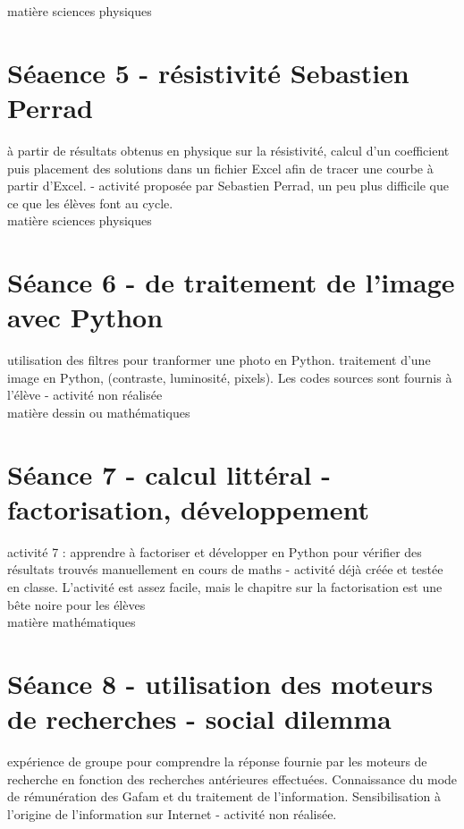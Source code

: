 \documentclass{moncours}
\begin{document}
matière sciences physiques

\section{Séaence 5 - résistivité Sebastien Perrad}

à partir de résultats obtenus en physique sur la résistivité, calcul d'un coefficient puis placement des solutions dans un fichier Excel afin de tracer une courbe à partir d'Excel. - activité proposée par Sebastien Perrad, un peu plus difficile que ce que les élèves font au cycle.\\

matière sciences physiques

\section{Séance 6 - de traitement de l'image avec Python}

utilisation des filtres pour tranformer une photo en Python. traitement d'une image en Python, (contraste, luminosité, pixels). Les codes sources sont fournis à l'élève - activité non réalisée\\

 matière dessin ou mathématiques

\section{Séance 7 - calcul littéral - factorisation, développement}

activité 7 : apprendre à factoriser et développer en Python pour vérifier des résultats trouvés manuellement en cours de maths - activité déjà créée et testée en classe. L'activité est assez facile, mais le chapitre sur la factorisation est une bête noire pour les élèves\\

matière mathématiques


\section{Séance 8 - utilisation des moteurs de recherches - social dilemma}

expérience de groupe pour comprendre la réponse fournie par les moteurs de recherche en fonction des recherches antérieures effectuées. Connaissance du mode de rémunération des Gafam et du traitement de l'information. Sensibilisation à l'origine de l'information sur Internet - activité non réalisée.\\
\end{document}
